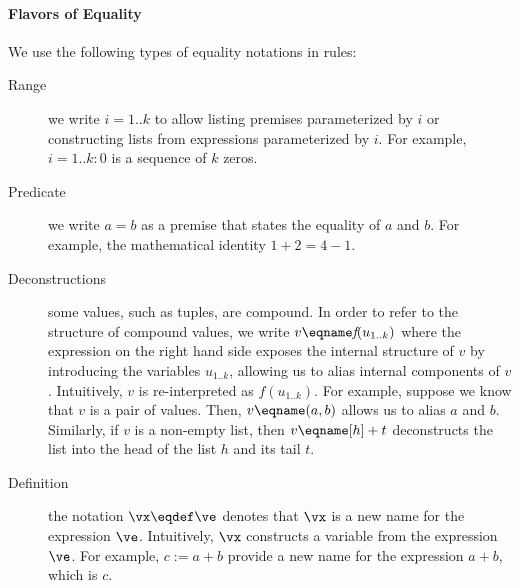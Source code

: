 \paragraph{Flavors of Equality}
We use the following types of equality notations in rules:
\begin{description}
  \item[Range] we write $i=1..k$ to allow listing premises parameterized by $i$ or constructing
  lists from expressions parameterized by $i$.
  For example, $i=1..k: 0$ is a sequence of $k$ zeros.
  \item[Predicate] we write $a = b$ as a premise that states the equality of $a$ and $b$.
  For example, the mathematical identity $1 + 2 = 4 - 1$.
  \item[Deconstructions] some values, such as tuples, are compound. In order to refer to the structure
  of compound values, we write $v \eqname \textit{f}(u_{1..k})$ where the expression on the right
  hand side exposes the internal structure of $v$ by introducing the variables
  $u_{1..k}$, allowing us to alias internal components of $v$.
  Intuitively, $v$ is re-interpreted as $\textit{f}(u_{1..k})$.
  For example, suppose we know that $v$ is a pair of values.
  Then, $v \eqname (a, b)$ allows us to alias $a$ and $b$.
  Similarly, if $v$ is a non-empty list, then $v \eqname [h] + t$ deconstructs the list into the
  head of the list $h$ and its tail $t$.
  \item[Definition] the notation $\vx \eqdef \ve$ denotes that $\vx$ is a new name for the expression $\ve$.
  Intuitively, $\vx$ constructs a variable from the expression $\ve$.
  For example, $c := a + b$ provide a new name for the expression $a+b$, which is $c$.
\end{description}
